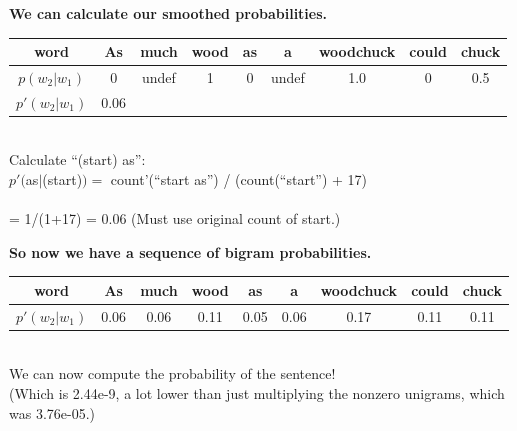 \documentclass{beamer}
\newcommand{\placard}[1]{
  \begin{frame}
    \begin{center}
      \huge
      \textbf{#1}
    \end{center}
  \end{frame}
}
\newcommand{\pagestepalt}[2]{
  \begin{frame}[t]
    \begin{minipage}[t][0.26\textheight][t]{\textwidth}
      \begin{center}
        \huge
        \textbf{#1}
      \end{center}
    \end{minipage}
    
    \begin{minipage}[t][0.7\textheight][t]{\textwidth}
      #2
    \end{minipage}
  \end{frame}
}
\begin{document}
\pagestepalt{We can calculate our smoothed probabilities.}{
  \begin{tabular}{c|cccccccc}
    word & As & much & wood & as & a & woodchuck & could & chuck\\
    \hline
    $p(w_2|w_1)$ &\alert{0}&\alert{undef}&\alert{1} & \alert{0} & \alert{undef} & \alert{1.0} & \alert{0} & 0.5\\
    \alert{$p'(w_2|w_1)$} & \alert{0.06} \\
  \end{tabular}  \\

  \vspace{0.1cm}
  Calculate ``(start) as'': 
  \\$p'($as$|$(start)$) =$ count'(``start as'') / (count(``start'') + 17)\\
  \\= 1/(1+17) = 0.06
  (Must use original count of start.)\\
}


\pagestepalt{So now we have a sequence of bigram probabilities.}{
  \begin{tabular}{c|cccccccc}
    word & As & much & wood & as & a & woodchuck & could & chuck\\
    \hline
    \alert{$p'(w_2|w_1)$} & \alert{0.06} & \alert{0.06} & \alert{0.11} & \alert{0.05} & \alert{0.06} & \alert{0.17} & \alert{0.11} & \alert{0.11}\\
  \end{tabular}  \\

  We can now compute the probability of the sentence!\pause \\
  (Which is
  2.44e-9, a lot lower than just multiplying the nonzero unigrams,
  which was 3.76e-05.)  
}



\end{document}
